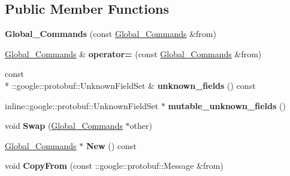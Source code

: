\subsection*{Public Member Functions}
\begin{DoxyCompactItemize}
\item 
\hypertarget{classvss__command_1_1Global__Commands_ac5a1e52df1880363fccb681c303ec821}{{\bfseries Global\-\_\-\-Commands} (const \hyperlink{classvss__command_1_1Global__Commands}{Global\-\_\-\-Commands} \&from)}\label{classvss__command_1_1Global__Commands_ac5a1e52df1880363fccb681c303ec821}

\item 
\hypertarget{classvss__command_1_1Global__Commands_a1e2590dfc4b0e2c8c20a8f5c68531a22}{\hyperlink{classvss__command_1_1Global__Commands}{Global\-\_\-\-Commands} \& {\bfseries operator=} (const \hyperlink{classvss__command_1_1Global__Commands}{Global\-\_\-\-Commands} \&from)}\label{classvss__command_1_1Global__Commands_a1e2590dfc4b0e2c8c20a8f5c68531a22}

\item 
\hypertarget{classvss__command_1_1Global__Commands_aadc4690c81ad4df3443b087428e1de73}{const \\*
\-::google\-::protobuf\-::\-Unknown\-Field\-Set \& {\bfseries unknown\-\_\-fields} () const }\label{classvss__command_1_1Global__Commands_aadc4690c81ad4df3443b087428e1de73}

\item 
\hypertarget{classvss__command_1_1Global__Commands_a1882397164e8072272d76b8172991013}{inline\-::google\-::protobuf\-::\-Unknown\-Field\-Set $\ast$ {\bfseries mutable\-\_\-unknown\-\_\-fields} ()}\label{classvss__command_1_1Global__Commands_a1882397164e8072272d76b8172991013}

\item 
\hypertarget{classvss__command_1_1Global__Commands_a1bf67bb767a2b899fceb94bf88a52ba7}{void {\bfseries Swap} (\hyperlink{classvss__command_1_1Global__Commands}{Global\-\_\-\-Commands} $\ast$other)}\label{classvss__command_1_1Global__Commands_a1bf67bb767a2b899fceb94bf88a52ba7}

\item 
\hypertarget{classvss__command_1_1Global__Commands_a6d4aeb9a55672fcfa0876e62de431a05}{\hyperlink{classvss__command_1_1Global__Commands}{Global\-\_\-\-Commands} $\ast$ {\bfseries New} () const }\label{classvss__command_1_1Global__Commands_a6d4aeb9a55672fcfa0876e62de431a05}

\item 
\hypertarget{classvss__command_1_1Global__Commands_a4bd5bb12d6e5f08346704aa04a30fe57}{void {\bfseries Copy\-From} (const \-::google\-::protobuf\-::\-Message \&from)}\label{classvss__command_1_1Global__Commands_a4bd5bb12d6e5f08346704aa04a30fe57}


\end{DoxyCompactItemize}
